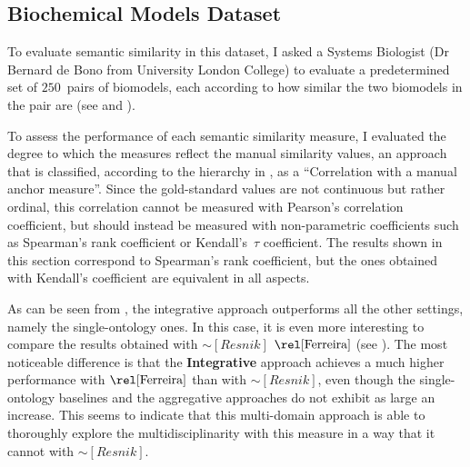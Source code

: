 \subsection{Biochemical Models Dataset} \label{sub:results/biomodels}

To evaluate semantic similarity in this dataset, I asked a Systems Biologist (Dr Bernard de Bono from University London College) to evaluate a predetermined set of $250$~pairs of biomodels, each according to how similar the two biomodels in the pair are (see  and ).

To assess the performance of each semantic similarity measure, I evaluated the degree to which the measures reflect the manual similarity values, an approach that is classified, according to the hierarchy in , as a ``Correlation with a manual anchor measure''. Since the gold-standard values are not continuous but rather ordinal, this correlation cannot be measured with Pearson's correlation coefficient, but should instead be measured with non-parametric coefficients such as Spearman's rank coefficient or Kendall's~$\tau$ coefficient. The results shown in this section correspond to Spearman's rank coefficient, but the ones obtained with Kendall's coefficient are equivalent in all aspects.

As can be seen from , the integrative approach outperforms all the other settings, namely the single-ontology ones. In this case, it is even more interesting to compare the results obtained with $\sim[Resnik]$ \vs $\ferreira$ (see ). The most noticeable difference is that the \textbf{Integrative} approach achieves a much higher performance with $\ferreira$ than with $\sim[Resnik]$, even though the single-ontology baselines and the aggregative approaches do not exhibit as large an increase. This seems to indicate that this multi-domain approach is able to thoroughly explore the multidisciplinarity with this measure in a way that it cannot with $\sim[Resnik]$.

